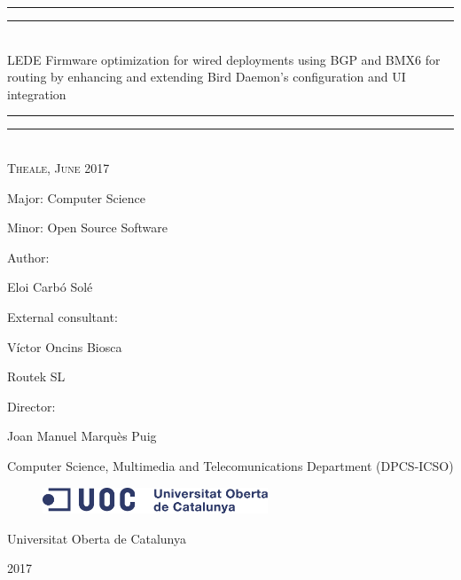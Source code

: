 \begin{titlepage}
    \centering
    \vspace*{\baselineskip}
    \rule{\textwidth}{1.6pt}\vspace*{-\baselineskip}\vspace*{2pt}
    \rule{\textwidth}{0.4pt}\\[\baselineskip]
    {\LARGE LEDE Firmware optimization for wired deployments using BGP and BMX6 for routing by enhancing and extending Bird Daemon's configuration and UI integration}
    \rule{\textwidth}{0.4pt}\vspace*{-\baselineskip}\vspace{3.2pt}
    \rule{\textwidth}{1.6pt}\\[\baselineskip]
    \scshape
    Theale, June 2017\par
    \vspace*{2\baselineskip}
    Major: Computer Science\par
    Minor: Open Source Software\par
    \vspace*{2\baselineskip}
    Author: \\
    {\Large Eloi Carb\'{o} Sol\'{e}\par}
    \vspace*{1\baselineskip}
    External consultant: \\
    {\large V\'{i}ctor Oncins Biosca\par}
    Routek SL\par
    \vspace*{1\baselineskip}
    Director: \\ 
    {\large Joan Manuel Marqu\`{e}s Puig\par}
    Computer Science, Multimedia and Telecomunications Department (DPCS-ICSO)
    \vfill
    \begin{figure}[ht!]
        \centering
        \includegraphics[width=0.6\textwidth]{images/logo}
	\end{figure}
    {\large Universitat Oberta de Catalunya}\par
    {\scshape 2017}
\end{titlepage}

\newpage


\newpage


\cleardoublepage

\pagestyle{plain}


\def\contentsname{Index}
\tableofcontents
\newpage

\listoffigures
\newpage
\lstlistoflistings
\newpage

